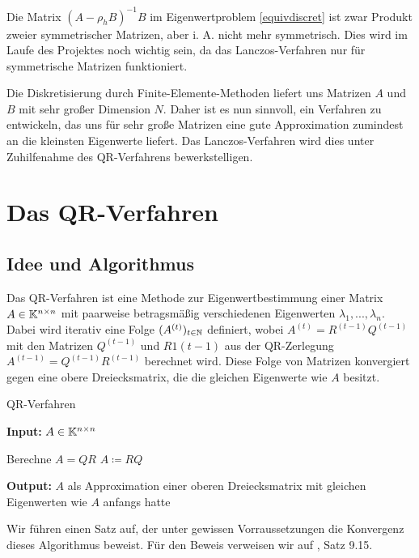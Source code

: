 \documentclass{article}
\begin{document}
\begin{remark}
	Die Matrix $(A - \rho_h B)^{-1} B$ im Eigenwertproblem \ref{equivdiscret} ist zwar Produkt zweier symmetrischer Matrizen, aber i. A. nicht mehr symmetrisch. Dies wird im Laufe des Projektes noch wichtig sein, da das Lanczos-Verfahren nur für symmetrische Matrizen funktioniert.
\end{remark}

Die Diskretisierung durch Finite-Elemente-Methoden liefert uns Matrizen $A$ und $B$ mit sehr großer Dimension $N$. Daher ist es nun sinnvoll, ein Verfahren zu entwickeln, das uns für sehr große Matrizen eine gute Approximation zumindest an die kleinsten Eigenwerte liefert. Das Lanczos-Verfahren wird dies unter Zuhilfenahme des QR-Verfahrens bewerkstelligen.

\section{Das QR-Verfahren}

\subsection{Idee und Algorithmus}

Das QR-Verfahren ist eine Methode zur Eigenwertbestimmung einer Matrix $A \in \mathbb{K}^{n \times n}$ mit paarweise betragsmäßig verschiedenen Eigenwerten $\lambda_1, ..., \lambda_n$. Dabei wird iterativ eine Folge $(A^{(t)})_{t \in \mathbb{N}}$ definiert, wobei $A^{(t)} = R^{(t-1)}Q^{(t-1)}$ mit den Matrizen $Q^{(t-1)}$ und $R1{(t-1)}$ aus der QR-Zerlegung $A^{(t-1)} = Q^{(t-1)}R^{(t-1)}$ berechnet wird. Diese Folge von Matrizen konvergiert gegen eine obere Dreiecksmatrix, die die gleichen Eigenwerte wie $A$ besitzt.

\renewcommand{\algorithmicrequire}{\textbf{Input:}}
\renewcommand{\algorithmicensure}{\textbf{Output:}}

\begin{algorithm}
	\label{QR-Verfahren}
	\caption{QR-Verfahren}
	\algorithmicrequire{ $A \in \mathbb{K}^{n\times n}$}
	\begin{algorithmic}[1]
		\State Berechne $A = QR$
		\State $A \coloneqq RQ$
		\EndWhile
	\end{algorithmic}
	\algorithmicensure{ $A$ als Approximation einer oberen Dreiecksmatrix mit gleichen Eigenwerten wie $A$ anfangs hatte}
\end{algorithm}


Wir führen einen Satz auf, der unter gewissen Vorraussetzungen die Konvergenz dieses Algorithmus beweist. Für den Beweis verweisen wir auf \cite{Nannen-Skript}, Satz 9.15.
\end{document}

